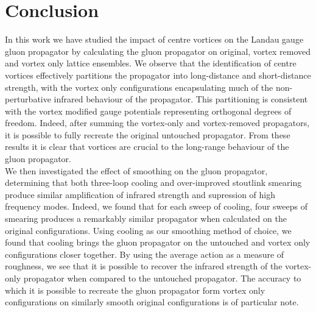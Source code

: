 
\chapter{Conclusion}\label{chapter:Conclusions}

\ifpdf
    \graphicspath{{Chapter8/Figs/Raster/}{Chapter8/Figs/PDF/}{Chapter8/Figs/}}
\else
    \graphicspath{{Chapter8/Figs/Vector/}{Chapter8/Figs/}}
\fi

In this work we have studied the impact of centre vortices on the Landau gauge gluon propagator by calculating the gluon propagator on original, vortex removed and vortex only lattice ensembles. We observe that the identification of centre vortices effectively partitions the propagator into long-distance and short-distance strength, with the vortex only configurations encapsulating much of the non-perturbative infrared behaviour of the propagator. This partitioning is consistent with the vortex modified gauge potentials representing orthogonal degrees of freedom. Indeed, after summing the vortex-only and vortex-removed propagators, it is possible to fully recreate the original untouched propagator. From these results it is clear that vortices are crucial to the long-range behaviour of the gluon propagator.\\

We then investigated the effect of smoothing on the gluon propagator, determining that both three-loop cooling and over-improved stoutlink smearing produce similar amplification of infrared strength and supression of high frequency modes. Indeed, we found that for each sweep of cooling, four sweeps of smearing produces a remarkably similar propagator when calculated on the original configurations. Using cooling as our smoothing method of choice, we found that cooling brings the gluon propagator on the untouched and vortex only configurations closer together. By using the average action as a measure of roughness, we see that it is possible to recover the infrared strength of the vortex-only propagator when compared to the untouched propagator. The accuracy to which it is possible to recreate the gluon propagator form vortex only configurations on similarly smooth original configurations is of particular note.\\

